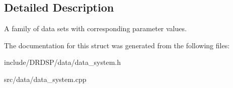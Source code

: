 \subsection{Detailed Description}
A family of data sets with corresponding parameter values. 

The documentation for this struct was generated from the following files\-:\begin{DoxyCompactItemize}
\item 
include/\-D\-R\-D\-S\-P/data/data\-\_\-system.\-h\item 
src/data/data\-\_\-system.\-cpp\end{DoxyCompactItemize}
